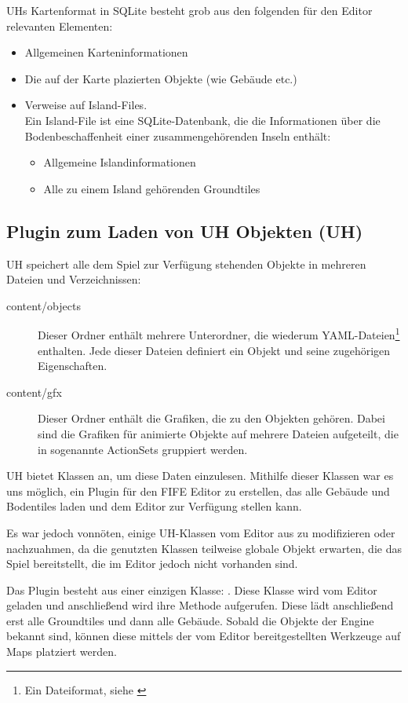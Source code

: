 UHs Kartenformat in SQLite besteht grob aus den folgenden für den
Editor relevanten Elementen:
\begin{itemize}
  \item Allgemeinen Karteninformationen
  \item Die auf der Karte plazierten Objekte (wie Gebäude etc.)
  \item Verweise auf Island-Files. \\
  Ein Island-File ist eine SQLite-Datenbank,
  die die Informationen über die Bodenbeschaffenheit einer zusammengehörenden
  Inseln enthält:
  \begin{itemize}
    \item Allgemeine Islandinformationen
    \item Alle zu einem Island gehörenden Groundtiles
  \end{itemize}
\end{itemize}


\subsection{Plugin zum Laden von UH Objekten (UH)}
UH speichert alle dem Spiel zur Verfügung stehenden Objekte in mehreren Dateien
und Verzeichnissen:

\begin{description}
\item[content/objects] Dieser Ordner enthält mehrere Unterordner, die wiederum
YAML-Dateien\footnote{Ein Dateiformat, siehe \cite{yaml}} enthalten. Jede
dieser Dateien definiert ein Objekt und seine zugehörigen Eigenschaften.
\item[content/gfx] Dieser Ordner enthält die Grafiken, die zu den Objekten
gehören. Dabei sind die Grafiken für animierte Objekte auf mehrere Dateien
aufgeteilt, die in sogenannte ActionSets gruppiert werden.
\end{description}

UH bietet Klassen an, um diese Daten einzulesen.
Mithilfe dieser Klassen war es uns möglich, ein
Plugin für den FIFE Editor zu erstellen, das alle Gebäude und Bodentiles
laden und dem Editor zur Verfügung stellen kann.

Es war jedoch vonnöten, einige UH-Klassen vom Editor aus zu
modifizieren oder nachzuahmen, da die genutzten Klassen teilweise
globale Objekt erwarten, die das Spiel bereitstellt, die im Editor
jedoch nicht vorhanden sind.

Das Plugin besteht aus einer einzigen Klasse: . Diese
Klasse wird vom Editor geladen und anschließend wird ihre  Methode
aufgerufen. Diese lädt anschließend erst alle Groundtiles und dann alle Gebäude.
Sobald die Objekte der Engine bekannt sind, können diese mittels der vom Editor
bereitgestellten Werkzeuge auf Maps platziert werden.

